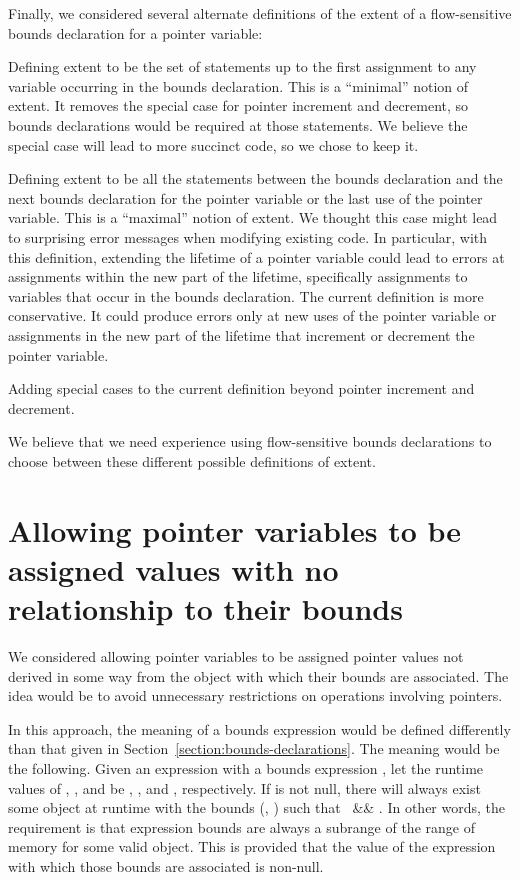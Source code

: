 Finally, we considered several alternate definitions of the extent of a
flow-sensitive bounds declaration for a pointer variable:
\begin{compactitem}
    \item Defining extent to be the set of statements up to the first assignment
          to any variable occurring in the bounds declaration.   This is a
          ``minimal'' notion of extent.  It removes the special case for
          pointer increment and decrement, so bounds
          declarations would be required at those statements.  We believe
          the special case will lead to more succinct code, so we chose to
          keep it.
    \item Defining extent to be all the statements between the bounds
          declaration and the next bounds declaration for
         the pointer variable or the last use of the pointer variable.  This
         is a ``maximal'' notion of extent.  We thought this case might
         lead to surprising error messages when modifying existing
         code.  In particular, with this definition, extending
         the lifetime of a pointer variable could lead to errors
         at assignments within the new part of the lifetime, specifically
         assignments to variables that occur in the bounds declaration.
         The current definition is more conservative.  It could produce errors
         only at new uses of the pointer variable or assignments in
         the new part of the lifetime that increment or decrement the pointer 
         variable.
  \item Adding special cases to the current definition beyond
        pointer increment and decrement.  
\end{compactitem}
We believe that we need experience using flow-sensitive bounds declarations
to choose between these different possible definitions of extent.

\section{Allowing pointer variables to be assigned values with no relationship to their bounds}

We considered allowing pointer variables to be assigned pointer values
not derived in some way from the object with which their bounds are
associated. The idea would be to avoid unnecessary restrictions on
operations involving pointers.

In this approach, the meaning of a bounds expression would be defined
differently than that given in Section~\ref{section:bounds-declarations}. 
The meaning would be the
following. Given an expression  with a bounds expression
, let the runtime
values of , , and  be , ,
and , respectively. If  is not null, there will
always exist some object at runtime with the bounds (,
) such that  \code{<=} \ \&\&
 \code{<=} . In other words, the
requirement is that expression bounds are always a subrange of the range
of memory for some valid object. This is provided that the value of the
expression with which those bounds are associated is non-null.

